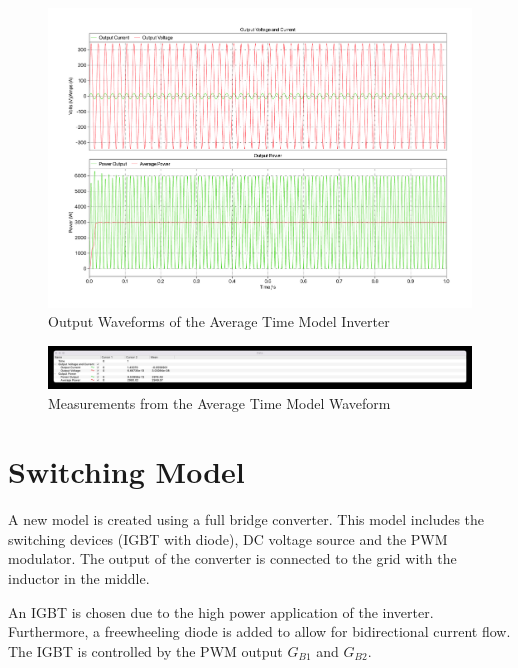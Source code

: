 \documentclass[12pt]{article}
\begin{document}
\begin{figure}[ht]
    \centering{}
    \includegraphics[width=\textwidth, height=0.4\textheight, keepaspectratio]{img/Average Time Power.pdf}
    \caption{Output Waveforms of the Average Time Model Inverter}
    \label{fig:avg-time-waveform}
\end{figure}

\begin{figure}[ht]
    \centering{}
    \includegraphics[width=\textwidth, height=0.4\textheight, keepaspectratio]{img/Average Timer Power Cursor.jpg}
    \caption{Measurements from the Average Time Model Waveform}
    \label{fig:avg-time-cursor}
\end{figure}

\section{Switching Model}

A new model is created using a full bridge converter.
This model includes the switching devices (IGBT with diode), DC voltage source and the PWM modulator.
The output of the converter is connected to the grid with the inductor in the middle.

An IGBT is chosen due to the high power application of the inverter.
Furthermore, a freewheeling diode is added to allow for bidirectional current flow.
The IGBT is controlled by the PWM output $G_{B1}$ and $G_{B2}$.
\end{document}
